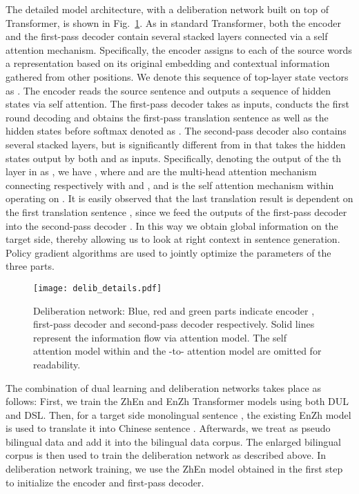 \documentclass[a4paper]{article}
\begin{document}
\begin{CJK*}{UTF8}{gbsn}
The detailed model architecture, with a deliberation network built on top of Transformer, is shown in Fig.~\ref{fig:delib_detail}. As in standard Transformer, both the encoder  and the first-pass decoder  contain several stacked layers connected via a self attention mechanism.
Specifically, the encoder assigns to each of the  source words a representation based on its original embedding and contextual information gathered from other positions. We denote this sequence of top-layer state vectors  as .
The encoder  reads the source sentence  and outputs a sequence of hidden states  via self attention. The first-pass decoder  takes  as inputs, conducts the first round decoding and obtains the first-pass translation sentence  as well as the hidden states before softmax denoted as . The second-pass decoder  also contains several stacked layers, but is significantly different from  in that  takes the hidden states output by both  and  as inputs. Specifically, denoting the output of the th layer in  as , we have , where  and  are the multi-head attention mechanism~\cite{vaswani2017attention} connecting  respectively with  and , and  is the self attention mechanism within  operating on . It is easily observed that the last translation result  is dependent on the first translation sentence , since we feed the outputs of the first-pass decoder  into the second-pass decoder . In this way we obtain global information on the target side, thereby allowing us to look at right context in sentence generation. Policy gradient algorithms are used to jointly optimize the parameters of the three parts.

\begin{figure}[!htpb]
	\centering
	\texttt{[image: delib\_details.pdf]}
	\caption{Deliberation network: Blue, red and green parts indicate encoder , first-pass decoder  and second-pass decoder  respectively. Solid lines represent the information flow via attention model. The self attention model within  and the -to- attention model are omitted for readability.}
	\label{fig:delib_detail}
\end{figure}

The combination of dual learning and deliberation networks takes place as follows: First, we train the  ZhEn and EnZh Transformer models using both DUL and DSL. Then, for a target side monolingual sentence , the existing EnZh model is used to translate it into Chinese sentence . Afterwards, we treat  as pseudo bilingual data and add it into the bilingual data corpus. The enlarged bilingual corpus is then used to train the deliberation network as described above. In deliberation network training, we use the ZhEn model obtained in the first step to initialize the encoder and first-pass decoder. 


\end{CJK*}
\end{document}
